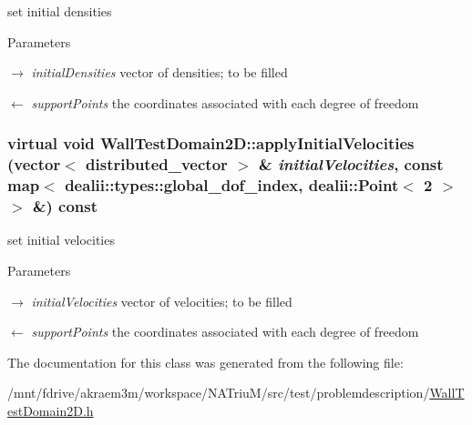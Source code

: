 set initial densities 
\begin{DoxyParams}{Parameters}
\item[\mbox{$\rightarrow$} {\em initialDensities}]vector of densities; to be filled \item[\mbox{$\leftarrow$} {\em supportPoints}]the coordinates associated with each degree of freedom \end{DoxyParams}
\hypertarget{classWallTestDomain2D_ad2f712c227bc9ada17002006e90de3a1}{
\subsubsection[{applyInitialVelocities}]{\setlength{\rightskip}{0pt plus 5cm}virtual void WallTestDomain2D::applyInitialVelocities (vector$<$ distributed\_\-vector $>$ \& {\em initialVelocities}, \/  const map$<$ dealii::types::global\_\-dof\_\-index, dealii::Point$<$ 2 $>$ $>$ \&) const}}
\label{classWallTestDomain2D_ad2f712c227bc9ada17002006e90de3a1}


set initial velocities 
\begin{DoxyParams}{Parameters}
\item[\mbox{$\rightarrow$} {\em initialVelocities}]vector of velocities; to be filled \item[\mbox{$\leftarrow$} {\em supportPoints}]the coordinates associated with each degree of freedom \end{DoxyParams}


The documentation for this class was generated from the following file:\begin{DoxyCompactItemize}
\item 
/mnt/fdrive/akraem3m/workspace/NATriuM/src/test/problemdescription/\hyperlink{WallTestDomain2D_8h}{WallTestDomain2D.h}\end{DoxyCompactItemize}
